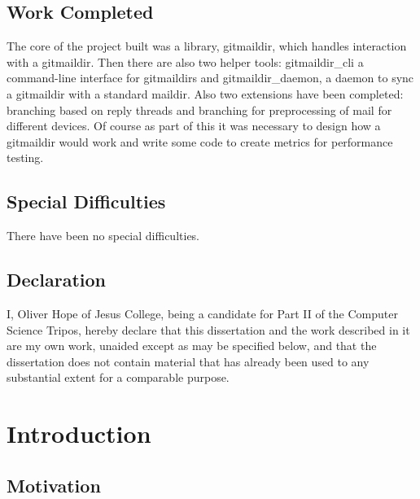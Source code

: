 \documentclass[12pt,a4paper,twoside,openright]{report}
\begin{document}
\section*{Work Completed}

The core of the project built was a library, gitmaildir, which handles interaction with a gitmaildir. Then there are also two helper tools: gitmaildir\_cli a command-line interface for gitmaildirs and gitmaildir\_daemon, a daemon to sync a gitmaildir with a standard maildir. Also two extensions have been completed: branching based on reply threads and branching for preprocessing of mail for different devices. Of course as part of this it was necessary to design how a gitmaildir would work and write some code to create metrics for performance testing.

\section*{Special Difficulties}

There have been no special difficulties.
 
\newpage
\section*{Declaration}

I, Oliver Hope of Jesus College, being a candidate for Part II of the Computer
Science Tripos, hereby declare
that this dissertation and the work described in it are my own work,
unaided except as may be specified below, and that the dissertation
does not contain material that has already been used to any substantial
extent for a comparable purpose.

\bigskip
{}

\medskip
{}

\tableofcontents

\listoffigures

\newpage

\pagestyle{headings}

\chapter{Introduction}

\section{Motivation}
\end{document}
